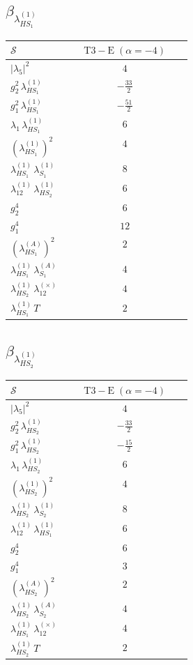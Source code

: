 \documentclass[9pt]{article}
\begin{document}
\subsection*{$ \beta_{\lambda_{HS_1}^{(1)}} $}
\begin{longtable}{@{}p{0.31\linewidth}c@{}}
\toprule
$\mathcal{S}$ & $ \mathrm{T3-E}\;(\alpha=-4) $ \\
\midrule
$ |\lambda_5|^2 $ & $ 4 $ \\
$ g_2^2\,\lambda_{HS_1}^{(1)} $ & $ - \frac{33}{2} $ \\
$ g_1^2\,\lambda_{HS_1}^{(1)} $ & $ - \frac{51}{2} $ \\
$ \lambda_1\,\lambda_{HS_1}^{(1)} $ & $ 6 $ \\
$ \left(\lambda_{HS_1}^{(1)}\right)^2 $ & $ 4 $ \\
$ \lambda_{HS_1}^{(1)}\,\lambda_{S_1}^{(1)} $ & $ 8 $ \\
$ \lambda_{12}^{(1)}\,\lambda_{HS_2}^{(1)} $ & $ 6 $ \\
$ g_2^4 $ & $ 6 $ \\
$ g_1^4 $ & $ 12 $ \\
$ \left(\lambda_{HS_1}^{(A)}\right)^2 $ & $ 2 $ \\
$ \lambda_{HS_1}^{(1)}\,\lambda_{S_1}^{(A)} $ & $ 4 $ \\
$ \lambda_{HS_2}^{(1)}\,\lambda_{12}^{(\times)} $ & $ 4 $ \\
$ \lambda_{HS_1}^{(1)}\,T $ & $ 2 $ \\
\bottomrule
\end{longtable}
\subsection*{$ \beta_{\lambda_{HS_2}^{(1)}} $}
\begin{longtable}{@{}p{0.31\linewidth}c@{}}
\toprule
$\mathcal{S}$ & $ \mathrm{T3-E}\;(\alpha=-4) $ \\
\midrule
$ |\lambda_5|^2 $ & $ 4 $ \\
$ g_2^2\,\lambda_{HS_2}^{(1)} $ & $ - \frac{33}{2} $ \\
$ g_1^2\,\lambda_{HS_2}^{(1)} $ & $ - \frac{15}{2} $ \\
$ \lambda_1\,\lambda_{HS_2}^{(1)} $ & $ 6 $ \\
$ \left(\lambda_{HS_2}^{(1)}\right)^2 $ & $ 4 $ \\
$ \lambda_{HS_2}^{(1)}\,\lambda_{S_2}^{(1)} $ & $ 8 $ \\
$ \lambda_{12}^{(1)}\,\lambda_{HS_1}^{(1)} $ & $ 6 $ \\
$ g_2^4 $ & $ 6 $ \\
$ g_1^4 $ & $ 3 $ \\
$ \left(\lambda_{HS_2}^{(A)}\right)^2 $ & $ 2 $ \\
$ \lambda_{HS_2}^{(1)}\,\lambda_{S_2}^{(A)} $ & $ 4 $ \\
$ \lambda_{HS_1}^{(1)}\,\lambda_{12}^{(\times)} $ & $ 4 $ \\
$ \lambda_{HS_2}^{(1)}\,T $ & $ 2 $ \\
\bottomrule
\end{longtable}
\end{document}
